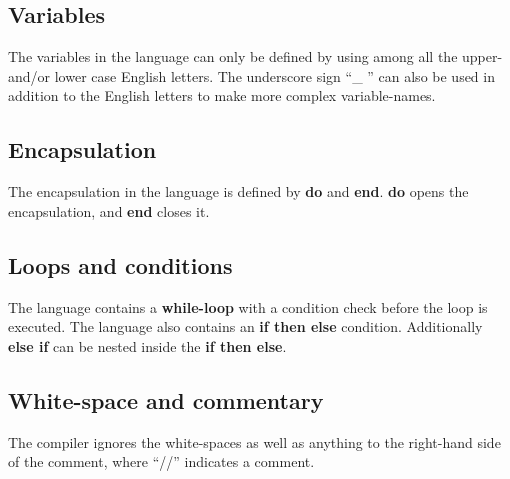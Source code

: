 \subsection{Variables}
The variables in the language can only be defined by using among all the upper- and/or lower case English letters. The underscore sign ``\_ '' can also be used in addition to the English letters to make more complex variable-names. 

\subsection{Encapsulation}
The encapsulation in the language is defined by \textbf{do} and \textbf{end}. \textbf{do} opens the encapsulation, and \textbf{end} closes it.   

\subsection{Loops and conditions}
The language contains a \textbf{while-loop} with a condition check before the loop is executed. The language also contains an \textbf{if then else} condition. Additionally \textbf{else if} can be nested inside the \textbf{if then else}.   

\subsection{White-space and commentary}
The compiler ignores the white-spaces as well as anything to the right-hand side of the comment, where ``//'' indicates a comment.


